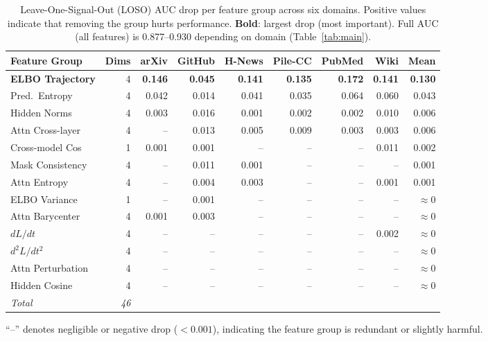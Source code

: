 \begin{table}[t]
\centering
\caption{Leave-One-Signal-Out (LOSO) AUC drop per feature group across six domains.
         Positive values indicate that removing the group hurts performance.
         \textbf{Bold}: largest drop (most important).
         Full AUC (all features) is 0.877--0.930 depending on domain (Table~\ref{tab:main}).}
\label{tab:ablation}
\small
\begin{tabular}{l r rrrrrr r}
\toprule
\textbf{Feature Group} & \textbf{Dims} & arXiv & GitHub & H-News & Pile-CC & PubMed & Wiki & \textbf{Mean} \\
\midrule
\textbf{ELBO Trajectory} & 4 & \textbf{0.146} & \textbf{0.045} & \textbf{0.141} & \textbf{0.135} & \textbf{0.172} & \textbf{0.141} & \textbf{0.130} \\
Pred.\ Entropy    & 4 & 0.042 & 0.014 & 0.041 & 0.035 & 0.064 & 0.060 & 0.043 \\
Hidden Norms      & 4 & 0.003 & 0.016 & 0.001 & 0.002 & 0.002 & 0.010 & 0.006 \\
Attn Cross-layer  & 4 & --    & 0.013 & 0.005 & 0.009 & 0.003 & 0.003 & 0.006 \\
Cross-model Cos   & 1 & 0.001 & 0.001 & --    & --    & --    & 0.011 & 0.002 \\
Mask Consistency  & 4 & --    & 0.011 & 0.001 & --    & --    & --    & 0.001 \\
Attn Entropy      & 4 & --    & 0.004 & 0.003 & --    & --    & 0.001 & 0.001 \\
ELBO Variance     & 1 & --    & 0.001 & --    & --    & --    & --    & $\approx$0 \\
Attn Barycenter   & 4 & 0.001 & 0.003 & --    & --    & --    & --    & $\approx$0 \\
$dL/dt$           & 4 & --    & --    & --    & --    & --    & 0.002 & $\approx$0 \\
$d^2L/dt^2$       & 4 & --    & --    & --    & --    & --    & --    & $\approx$0 \\
Attn Perturbation & 4 & --    & --    & --    & --    & --    & --    & $\approx$0 \\
Hidden Cosine     & 4 & --    & --    & --    & --    & --    & --    & $\approx$0 \\
\midrule
\textit{Total}    & \textit{46} & & & & & & & \\
\bottomrule
\end{tabular}
\vspace{1pt}
{\footnotesize ``--'' denotes negligible or negative drop ($<0.001$), indicating the feature group is redundant or slightly harmful.}
\end{table}
